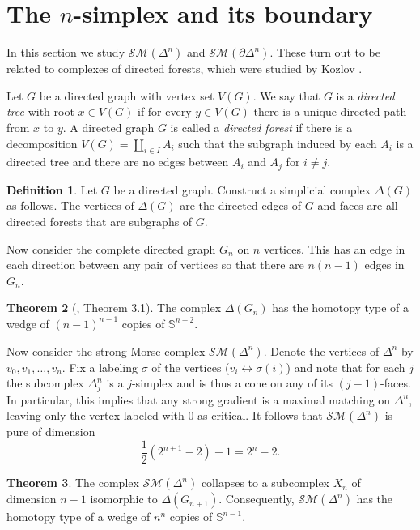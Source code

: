 \documentclass{amsart}
\theoremstyle{definition}
\newtheorem{theorem}{Theorem}[section]
\newtheorem{definition}[theorem]{Definition}
\newcommand{\zs}{{\mathbb S}}
\newcommand{\sm}{{\mathcal{SM}}}
\begin{document}
\section{The $n$-simplex and its boundary}
In this section we study $\sm(\Delta^n)$ and $\sm(\partial\Delta^n)$. These turn out to be related to complexes of directed forests, which were studied by Kozlov \cite{Kozlov1999}. 

Let $G$ be a directed graph with vertex set $V(G)$. We say that $G$ is a {\em directed tree} with root $x\in V(G)$ if for every $y\in V(G)$ there is a unique directed path from $x$ to $y$. A directed graph $G$ is called a {\em directed forest} if there is a decomposition $V(G)=\coprod_{i\in I} A_i$ such that the subgraph induced by each $A_i$ is a directed tree and there are no edges between $A_i$ and $A_j$ for $i\ne j$. 

\begin{definition}
    Let $G$ be a directed graph. Construct a simplicial complex $\Delta(G)$ as follows. The vertices of $\Delta(G)$ are the directed edges of $G$ and faces are all directed forests that are subgraphs of $G$.
\end{definition}

Now consider the complete directed graph $G_n$ on $n$ vertices. This has an edge in each direction between any pair of vertices so that there are $n(n-1)$ edges in $G_n$. 

\begin{theorem}[\cite{Kozlov1999}, Theorem 3.1]\label{kozlovwedge} The complex $\Delta(G_n)$ has the homotopy type of a wedge of $(n-1)^{n-1}$ copies of $\zs^{n-2}$.
\end{theorem}


Now consider the strong Morse complex $\sm(\Delta^n)$. Denote the vertices of $\Delta^n$ by $v_0,v_1,\dots,v_n$. Fix a labeling $\sigma$ of the vertices ($v_i\leftrightarrow \sigma(i)$) and note that for each $j$ the subcomplex $\Delta^n_j$ is a $j$-simplex and is thus a cone on any of its $(j-1)$-faces. In particular, this implies that any strong gradient is a maximal matching on $\Delta^n$, leaving only the vertex labeled with $0$ as critical. It follows that $\sm(\Delta^n)$ is pure of dimension 
$$\frac{1}{2}(2^{n+1}-2)-1=2^n-2.$$

\begin{theorem}\label{strongsimplex}
    The complex $\sm(\Delta^n)$ collapses to a subcomplex $X_n$ of dimension $n-1$ isomorphic to $\Delta(G_{n+1})$. Consequently, $\sm(\Delta^n)$ has the homotopy type of a wedge of $n^n$ copies of $\zs^{n-1}$.
\end{theorem}
\end{document}
